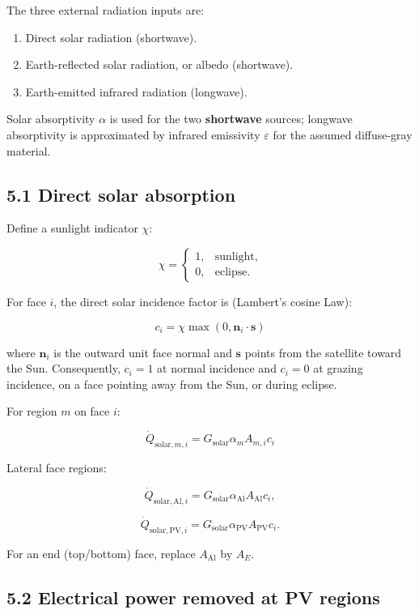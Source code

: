 \documentclass[
]{book}
\providecommand{\tightlist}{%
  \setlength{\itemsep}{0pt}\setlength{\parskip}{0pt}}
\begin{document}
The three external radiation inputs are:

\begin{enumerate}
\def\labelenumi{\arabic{enumi}.}
\tightlist
\item
  Direct solar radiation (shortwave).
\item
  Earth-reflected solar radiation, or albedo (shortwave).
\item
  Earth-emitted infrared radiation (longwave).
\end{enumerate}

Solar absorptivity \(\alpha\) is used for the two \textbf{shortwave} sources; longwave absorptivity is approximated by infrared emissivity \(\varepsilon\) for the assumed diffuse-gray material.

\subsection{5.1 Direct solar absorption}\label{direct-solar-absorption}

Define a sunlight indicator \(\chi\):

\[
\chi=
\begin{cases}
1,&\text{sunlight},\\
0,&\text{eclipse}.
\end{cases}
\]

For face \(i\), the direct solar incidence factor is (Lambert's cosine Law):

\[
\boxed{c_i=\chi\max\!\left(0,\mathbf n_i\cdot\mathbf s\right)}
\]

where \(\mathbf n_i\) is the outward unit face normal and \(\mathbf s\) points from the satellite toward the Sun. Consequently, \(c_i=1\) at normal incidence and \(c_i=0\) at grazing incidence, on a face pointing away from the Sun, or during eclipse.

For region \(m\) on face \(i\):

\[
\boxed{\dot Q_{\mathrm{solar},m,i}=G_{\mathrm{solar}}\alpha_m A_{m,i}c_i}
\]

Lateral face regions:

\[
\dot Q_{\mathrm{solar,Al},i}=G_{\mathrm{solar}}\alpha_{\mathrm{Al}}A_{\mathrm{Al}}c_i,
\]

\[
\dot Q_{\mathrm{solar,PV},i}=G_{\mathrm{solar}}\alpha_{\mathrm{PV}}A_{\mathrm{PV}}c_i.
\]

For an end (top/bottom) face, replace \(A_{\mathrm{Al}}\) by \(A_E\).

\subsection{5.2 Electrical power removed at PV regions}\label{electrical-power-removed-at-pv-regions}
\end{document}
